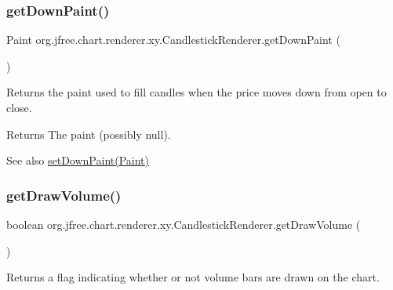\subsubsection{\texorpdfstring{get\+Down\+Paint()}{getDownPaint()}}
{\footnotesize\ttfamily Paint org.\+jfree.\+chart.\+renderer.\+xy.\+Candlestick\+Renderer.\+get\+Down\+Paint (\begin{DoxyParamCaption}{ }\end{DoxyParamCaption})}

Returns the paint used to fill candles when the price moves down from open to close.

\begin{DoxyReturn}{Returns}
The paint (possibly {\ttfamily null}).
\end{DoxyReturn}
\begin{DoxySeeAlso}{See also}
\mbox{\hyperlink{classorg_1_1jfree_1_1chart_1_1renderer_1_1xy_1_1_candlestick_renderer_a4f4d646b118cd0fd8cb206e0d405add5}{set\+Down\+Paint(\+Paint)}} 
\end{DoxySeeAlso}
\mbox{\label{classorg_1_1jfree_1_1chart_1_1renderer_1_1xy_1_1_candlestick_renderer_a031b1f856f7ef71b3ec51e52604c9dfe}} 
\subsubsection{\texorpdfstring{get\+Draw\+Volume()}{getDrawVolume()}}
{\footnotesize\ttfamily boolean org.\+jfree.\+chart.\+renderer.\+xy.\+Candlestick\+Renderer.\+get\+Draw\+Volume (\begin{DoxyParamCaption}{ }\end{DoxyParamCaption})}

Returns a flag indicating whether or not volume bars are drawn on the chart.

